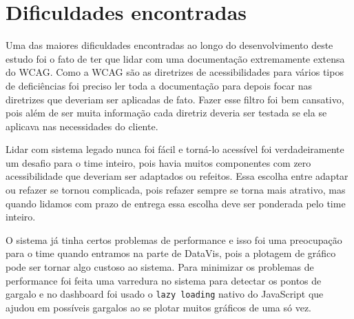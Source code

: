 \section{Dificuldades encontradas}
\label{sec:dificuldades}
{
Uma das maiores dificuldades encontradas ao longo do desenvolvimento deste estudo foi o fato de ter que lidar com uma documentação extremamente extensa do WCAG. Como a WCAG são as diretrizes de acessibilidades para vários tipos de deficiências foi preciso ler toda a documentação para depois focar nas diretrizes que deveriam ser aplicadas de fato. Fazer esse filtro foi bem cansativo, pois além de ser muita informação cada diretriz deveria ser testada se ela se aplicava nas necessidades do cliente.

Lidar com sistema legado nunca foi fácil e torná-lo acessível foi verdadeiramente um desafio para o time inteiro, pois havia muitos componentes com zero acessibilidade que deveriam ser adaptados ou refeitos. Essa escolha entre adaptar ou refazer se tornou complicada, pois refazer sempre se torna mais atrativo, mas quando lidamos com prazo de entrega essa escolha deve ser ponderada pelo time inteiro.

O sistema já tinha certos problemas de performance e isso foi uma preocupação para o time quando entramos na parte de DataVis, pois a plotagem de gráfico pode ser tornar algo custoso ao sistema. Para minimizar os problemas de performance foi feita uma varredura no sistema para detectar os pontos de gargalo e no dashboard foi usado o \lstinline{lazy loading} nativo do JavaScript que ajudou em possíveis gargalos ao se plotar muitos gráficos de uma só vez. 
}

